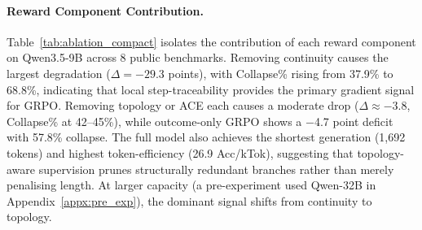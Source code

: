 

\paragraph{Reward Component Contribution.}
Table~\ref{tab:ablation_compact} isolates the contribution of each reward component on Qwen3.5-9B across 8 public benchmarks.
Removing continuity causes the largest degradation ($\Delta{=}{-}29.3$ points), with Collapse\% rising from 37.9\% to 68.8\%, indicating that local step-traceability provides the primary gradient signal for GRPO.
Removing topology or ACE each causes a moderate drop ($\Delta{\approx}{-}3.8$, Collapse\% at 42--45\%), while outcome-only GRPO shows a $-$4.7 point deficit with 57.8\% collapse.
The full model also achieves the shortest generation (1,692 tokens) and highest token-efficiency (26.9 Acc/kTok), suggesting that topology-aware supervision prunes structurally redundant branches rather than merely penalising length.
At larger capacity (a pre-experiment used Qwen-32B in Appendix~\ref{appx:pre_exp}), the dominant signal shifts from continuity to topology.


%


